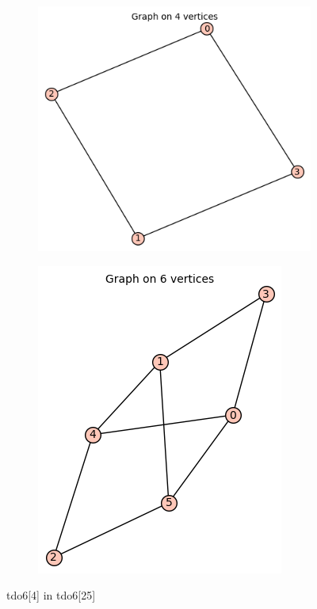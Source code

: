 \documentclass[12pt, a4paper]{article}
\begin{document}
\begin{center}
\begin{figure}[!htb]
\centering
\begin{subfigure}{0.5\textwidth}
  \centering
  \includegraphics[width=0.5\linewidth]{tdo6[4]}
\end{subfigure}%
\begin{subfigure}{0.5\textwidth}
  \centering
  \includegraphics[width=0.5\linewidth]{tdo6[25]}
\end{subfigure}
\caption{tdo6[4] in tdo6[25]}
\label{fig:test}
\end{figure}


\end{center}
\end{document}
